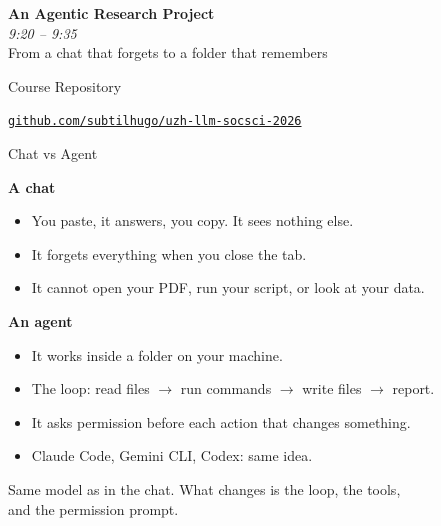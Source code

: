 \documentclass[svgnames,x11names,dvipsnames]{beamer}
\begin{document}

\begin{frame}[plain]
  \centering
  \vfill
  {\Huge \textbf{\textcolor{titleblue}{An Agentic Research Project}}}\\[0.4cm]
  {\Large \textit{9:20 -- 9:35}}\\[0.3cm]
  {\large From a chat that forgets to a folder that remembers}
  \vfill
\end{frame}

\begin{frame}{Course Repository}

\centering
\vspace{0.2cm}

\vspace{0.5cm}
{\large \href{https://github.com/subtilhugo/uzh-llm-socsci-2026}{\texttt{github.com/subtilhugo/uzh-llm-socsci-2026}}}


\end{frame}

\begin{frame}{Chat vs Agent}

\textbf{A chat}
\begin{itemize}
    \item You paste, it answers, you copy. It sees nothing else.
    \item It forgets everything when you close the tab.
    \item It cannot open your PDF, run your script, or look at your data.
\end{itemize}

\vspace{0.3cm}

\textbf{An agent}
\begin{itemize}
    \item It works inside a folder on your machine.
    \item The loop: read files $\rightarrow$ run commands $\rightarrow$ write files $\rightarrow$ report.
    \item It asks permission before each action that changes something.
    \item Claude Code, Gemini CLI, Codex: same idea.
\end{itemize}

\vspace{0.4cm}

\centering
Same model as in the chat. What changes is the loop, the tools,\\ and the permission prompt.

\end{frame}
\end{document}
